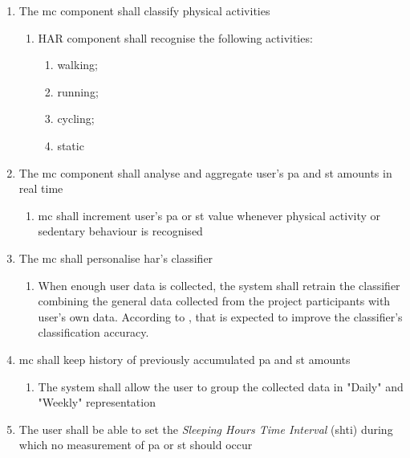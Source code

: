     \begin{enumerate}
        \item The \gls{mc} component shall classify physical activities
        \begin{enumerate}
            \item HAR component shall recognise the following activities:
            \begin{enumerate}
                \item walking;
                \item running;
                \item cycling;
                \item static
            \end{enumerate}
        \end{enumerate}
        \item The \gls{mc} component shall analyse and aggregate user's \gls{pa} and \gls{st} amounts in real time
            \begin{enumerate}
                \item \gls{mc} shall increment user's \gls{pa} or \gls{st} value whenever physical activity or sedentary behaviour is recognised
            \end{enumerate}
        \item The \gls{mc} shall personalise \gls{har}'s classifier
            \begin{enumerate}
                \item When enough user data is collected, the system shall retrain the classifier combining the general data collected from the project participants with user's own data. According to \citet[376]{arapakis_athanasakos_jose_2010}, that is expected to improve the classifier's classification accuracy.
            \end{enumerate}
            
        \item \gls{mc} shall keep history of previously accumulated \gls{pa} and \gls{st} amounts
            \begin{enumerate}
                \item The system shall allow the user to group the collected data in "Daily" and "Weekly" representation
            \end{enumerate}
        
        \item The user shall be able to set the \textit{Sleeping Hours Time Interval} (\gls{shti}) during which no measurement of \gls{pa} or \gls{st} should occur
      
    \end{enumerate}
    
